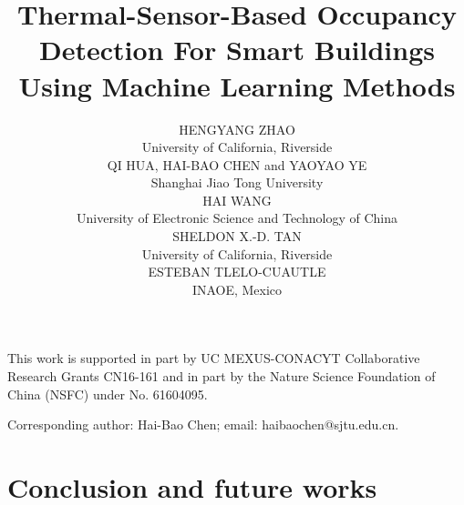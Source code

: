 \documentclass[acmtodaes,notfinal]{acmtrans2m}
\title{Thermal-Sensor-Based Occupancy Detection For Smart Buildings Using Machine Learning Methods}
\author{ \small
HENGYANG ZHAO\\
University of California, Riverside\\
QI HUA, HAI-BAO CHEN and YAOYAO YE \\
Shanghai Jiao Tong University\\
HAI WANG \\
University of Electronic Science and Technology of China\\
SHELDON X.-D. TAN \\
University of California, Riverside\\
ESTEBAN TLELO-CUAUTLE \\
INAOE, Mexico
}
\let\orgsetcounter\setcounter
\begin{document}
{\let\setcounter\orgsetcounter
\begin{bottomstuff}
  \newline \indent This work is supported in part by UC MEXUS-CONACYT
  Collaborative Research Grants CN16-161 and in part by the Nature
  Science Foundation of China (NSFC) under No. 61604095.

  Corresponding author: Hai-Bao Chen; email: haibaochen@sjtu.edu.cn.

\end{bottomstuff}
}

\maketitle












\section{Conclusion and future works}
\label{sec:conclution}
\end{document}
